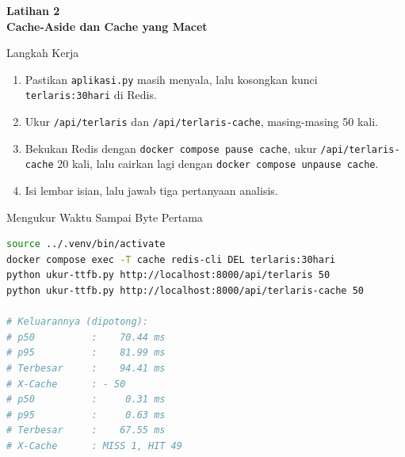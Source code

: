 \documentclass[aspectratio=169, table, 12pt]{beamer}
\begin{document}
\begin{frame}{\hfill}
  \centering
  \Huge{\textbf{Latihan 2\\Cache-Aside dan Cache yang Macet}}
\end{frame}

\begin{frame}{{\Large Langkah Kerja}}
  \vspace{6pt}
  \begin{enumerate}
    \item Pastikan \texttt{aplikasi.py} masih menyala, lalu kosongkan kunci
          \texttt{terlaris:30hari} di Redis.
    \item Ukur \texttt{/api/terlaris} dan \texttt{/api/terlaris-cache},
          masing-masing 50 kali.
    \item Bekukan Redis dengan \texttt{docker compose pause cache}, ukur
          \texttt{/api/terlaris-cache} 20 kali, lalu cairkan lagi dengan
          \texttt{docker compose unpause cache}.
    \item Isi lembar isian, lalu jawab tiga pertanyaan analisis.
  \end{enumerate}
\end{frame}

\begin{frame}[fragile]{{\Large Mengukur Waktu Sampai Byte Pertama}}
  \vspace{2pt}
\begin{lstlisting}[language=bash]
source ../.venv/bin/activate
docker compose exec -T cache redis-cli DEL terlaris:30hari
python ukur-ttfb.py http://localhost:8000/api/terlaris 50
python ukur-ttfb.py http://localhost:8000/api/terlaris-cache 50

# Keluarannya (dipotong):
# p50          :    70.44 ms
# p95          :    81.99 ms
# Terbesar     :    94.41 ms
# X-Cache      : - 50
# p50          :     0.31 ms
# p95          :     0.63 ms
# Terbesar     :    67.55 ms
# X-Cache      : MISS 1, HIT 49
\end{lstlisting}
\end{frame}
\end{document}
